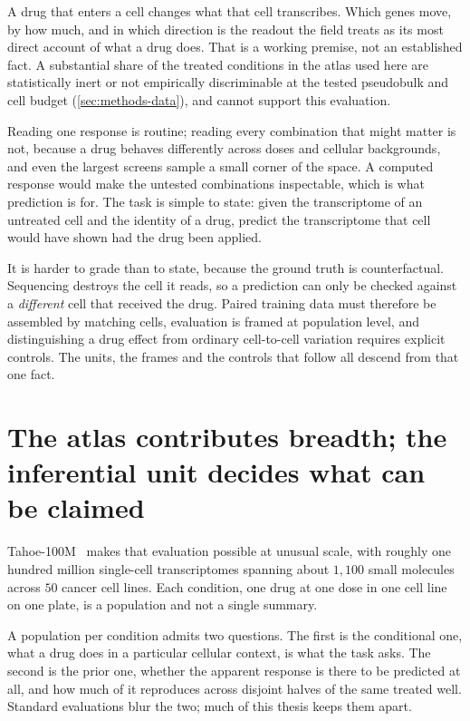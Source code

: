 A drug that enters a cell changes what that cell transcribes. Which genes move,
by how much, and in which direction is the readout the field treats as its most
direct account of what a drug does. That is a working premise, not an
established fact. A substantial share of the treated conditions in the atlas
used here are statistically inert or not empirically discriminable at the tested
pseudobulk and cell budget (\cref{sec:methods-data}), and cannot support this
evaluation.

Reading one response is routine; reading every combination that might matter is
not, because a drug behaves differently across doses and cellular backgrounds,
and even the largest screens sample a small corner of the space. A computed
response would make the untested combinations inspectable, which is what
prediction is for. The task is simple to state: given the transcriptome of an
untreated cell and the identity of a drug, predict the transcriptome that cell
would have shown had the drug been applied.

It is harder to grade than to state, because the ground truth is
counterfactual. Sequencing destroys the cell it reads, so a prediction can only
be checked against a \emph{different} cell that received the drug. Paired
training data must therefore be assembled by matching cells, evaluation is
framed at population level, and distinguishing a drug effect from ordinary
cell-to-cell variation requires explicit controls. The units, the frames and
the controls that follow all descend from that one fact.

\section{The atlas contributes breadth; the inferential unit decides what can be
claimed}
\label{sec:intro-atlas}

Tahoe-100M~\cite{tahoe100m} makes that evaluation possible at unusual scale,
with roughly one hundred million single-cell transcriptomes spanning about
$1{,}100$ small molecules across $50$ cancer cell lines. Each condition, one
drug at one dose in one cell line on one plate, is a population and not a
single summary.

A population per condition admits two questions. The first is the conditional one, what a
drug does in a particular cellular context, is what the task asks. The second is the prior one, whether the apparent response is there to be predicted at all, and how much
of it reproduces across disjoint halves of the same treated well. Standard
evaluations blur the two; much of this thesis keeps them apart.

